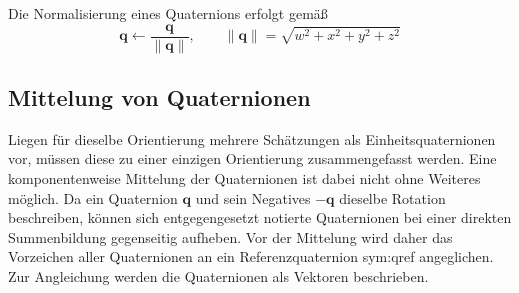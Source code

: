 Die Normalisierung eines Quaternions erfolgt gemäß
\begin{equation}
\mathbf{q} \leftarrow \frac{\mathbf{q}}{\|\mathbf{q}\|}, \qquad \|\mathbf{q}\| = \sqrt{w^2 + x^2 + y^2 + z^2}
\label{eq:quaternion_normalisierung}
\end{equation}


\subsection*{Mittelung von Quaternionen}
\label{sec:quaternionen_mittelung}
Liegen für dieselbe Orientierung mehrere Schätzungen als Einheitsquaternionen vor, müssen diese zu einer einzigen Orientierung zusammengefasst werden.
Eine komponentenweise Mittelung der Quaternionen ist dabei nicht ohne Weiteres möglich.
Da ein Quaternion $\mathbf{q}$ und sein Negatives $-\mathbf{q}$ dieselbe Rotation beschreiben, 
können sich entgegengesetzt notierte Quaternionen bei einer direkten Summenbildung gegenseitig aufheben.
Vor der Mittelung wird daher das Vorzeichen aller Quaternionen an ein Referenzquaternion \gls{sym:qref} angeglichen.
Zur Angleichung werden die Quaternionen als Vektoren beschrieben.~\cite{Markley2007}

